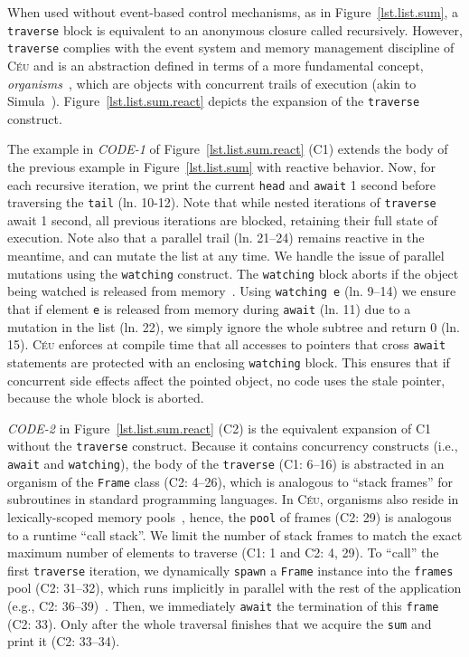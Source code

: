 \documentclass{sig-alternate}
\newcommand{\CEU}{\textsc{C\'{e}u}\xspace}
\newcommand{\code}[1] {{\small{\texttt{#1}}}}
\newcommand{\MM}[1] {\textcircled{\tiny{\textsf{#1}}}}
\begin{document}
When used without event-based control mechanisms, as in 
Figure~\ref{lst.list.sum}, a \code{traverse} block is equivalent to an 
anonymous closure called recursively.
%
However, \code{traverse} complies with the event system and memory management 
discipline of \CEU and is an abstraction defined in terms of a more fundamental 
concept, \emph{organisms}~\cite{ceu.mod15}, which are objects with concurrent 
trails of execution (akin to Simula~\cite{simula}).
%
Figure~\ref{lst.list.sum.react} depicts the expansion of the \code{traverse} 
construct.

The example in \emph{CODE-1} of Figure~\ref{lst.list.sum.react} (\MM{C1}) 
extends the body of the previous example in Figure~\ref{lst.list.sum} with 
reactive behavior.
%
Now, for each recursive iteration, we print the current \code{head} 
and \code{await} 1 second before traversing the \code{tail} (ln. 10-12).
%
Note that while nested iterations of \code{traverse} await 1 second, all 
previous iterations are blocked, retaining their full state of execution.
%
Note also that a parallel trail (ln. 21--24) remains reactive in the 
meantime, and can mutate the list at any time.
%
We handle the issue of parallel mutations using the \code{watching} construct.
The \code{watching} block aborts if the object being watched
is released from memory~\cite{ceu.mod15}.
%
Using \code{watching e} (ln. 9--14) we ensure that if element \code{e}
is released from memory during \code{await} (ln. 11) due to a 
mutation in the list (ln. 22), we simply ignore the whole subtree and return 0 
(ln. 15).
%
\CEU enforces at compile time that all accesses to pointers that cross 
\code{await} statements are protected with an enclosing \code{watching} block.
%
This ensures that if concurrent side effects affect the pointed object, no code 
uses the stale pointer, because the whole block is aborted.

\emph{CODE-2} in Figure~\ref{lst.list.sum.react} (\MM{C2}) is the equivalent 
expansion of \MM{C1} without the \code{traverse} construct.
%
Because it contains concurrency constructs (i.e., \code{await} and 
\code{watching}), the body of the \code{traverse} (\MM{C1}: 6--16) is 
abstracted in an organism of the \code{Frame} class (\MM{C2}: 4--26), which is 
analogous to ``stack frames'' for subroutines in standard programming 
languages.
%
In \CEU, organisms also reside in lexically-scoped memory 
pools~\cite{ceu.mod15}, hence, the \code{pool} of frames (\MM{C2}: 29) is 
analogous to a runtime ``call stack''.
We limit the number of stack frames to match the exact maximum number of 
elements to traverse (\MM{C1}: 1 and \MM{C2}: 4, 29).
%
To ``call'' the first \code{traverse} iteration, we dynamically \code{spawn} a 
\code{Frame} instance into the \code{frames} pool (\MM{C2}: 31--32), which runs 
implicitly in parallel with the rest of the application (e.g., \MM{C2}: 36--39)~\cite{ceu.mod15}.
Then, we immediately \code{await} the termination of this \code{frame} 
(\MM{C2}: 33).
Only after the whole traversal finishes 
that we acquire the \code{sum} and print it (\MM{C2}: 33--34).
\end{document}
